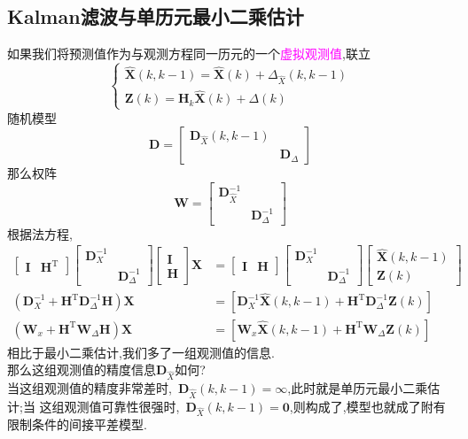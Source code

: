 \documentclass[cn,10pt,citestyle=gb7714-2015,bibstyle=gb7714-2015]{elegantbook}
\newcommand{\mT}{\mathrm{T}}
\begin{document}
\subsection{Kalman滤波与单历元最小二乘估计}
如果我们将预测值作为与观测方程同一历元的一个\textcolor{magenta}{虚拟观测值},联立
\begin{equation}
  \begin{cases}
    \hat{\bm{X}}(k,k-1)=\hat{\bm{X}}(k)+\bm{\varDelta}_{\hat{X}}(k,k-1)\\
    \bm{Z}(k)=\bm{H}_k\hat{\bm{X}}(k)+\bm{\varDelta}(k)
  \end{cases}
\end{equation}
随机模型
\begin{equation}
  \bm{D}=\begin{bmatrix}
    \bm{D}_{\hat{X}}(k,k-1)& \\
     &\bm{D}_\varDelta
  \end{bmatrix}
\end{equation}
那么权阵
\[
  \bm{W}=\begin{bmatrix}
    \bm{D}_{\hat{X}}^{-1}& \\
     &\bm{D}_{\varDelta}^{-1}
  \end{bmatrix}
\]
根据法方程,
\begin{align*}
  \begin{bmatrix}
    \bm{I}&\bm{H}^\mT
  \end{bmatrix}
  \begin{bmatrix}
    \bm{D}_X^{-1}& \\
     &\bm{D}_\varDelta^{-1}
  \end{bmatrix}
  \begin{bmatrix}
    \bm{I}\\
    \bm{H}
  \end{bmatrix}\bm{X}&=
  \begin{bmatrix}
    \bm{I}&\bm{H}
  \end{bmatrix}
  \begin{bmatrix}
    \bm{D}_X^{-1}& \\
     &\bm{D}_\varDelta^{-1}
  \end{bmatrix}
  \begin{bmatrix}
    \hat{\bm{X}}(k,k-1)\\
    \bm{Z}(k)
  \end{bmatrix}\\
  \left(\bm{D}_X^{-1}+\bm{H}^\mT\bm{D}_\varDelta^{-1}\bm{H}\right)\bm{X}&=\left[\bm{D}_X^{-1}\hat{\bm{X}}(k,k-1)+\bm{H}^\mT\bm{D}_\varDelta^{-1}\bm{Z}(k)\right]\\
  \left(\bm{W}_x+\bm{H}^\mT\bm{W}_\varDelta\bm{H}\right)\bm{X}&=\left[\bm{W}_x\hat{\bm{X}}(k,k-1)+\bm{H}^\mT\bm{W}_\varDelta\bm{Z}(k)\right]
\end{align*}
相比于最小二乘估计,我们多了一组观测值的信息.\\
\textcolor{magenta}{\HandRight}那么这组观测值的精度信息$\bm{D}_{\hat{X}}$如何?\\
当这组观测值的精度非常差时,\ $\bm{D}_{\hat{X}}(k,k-1)=\infty$,此时就是单历元最小二乘估计;当
这组观测值可靠性很强时,\ $\bm{D}_{\hat{X}}(k,k-1)=\bm{0}$,则构成了,模型也就成了\colorbox{yellow!20}{附有限制条件的间接平差模型}.
\end{document}
